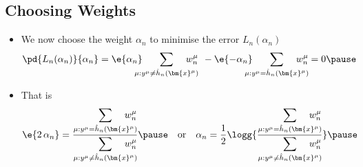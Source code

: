 \begin{slide}
\section{Choosing Weights}

\begin{PauseHighLight}
  \begin{itemize}
  \item We now choose the weight $\alpha_n$ to minimise the error $L_n(\alpha_n)$
    \begin{align*}
      \pd{L_n(\alpha_n)}{\alpha_n} = 
       \e{\alpha_n} \hspace{-1em} \sum_{\mu:y^\mu\neq
      \hat{h}_n(\bm{x}^\mu)} \hspace{-1.5em}  w_n^\mu\, \;- 
      \e{-\alpha_n} \hspace{-1em} \sum_{\mu:y^\mu= \hat{h}_n(\bm{x}^\mu)}
      \hspace{-1.5em} w_n^\mu =0\pause
    \end{align*}
  \item That is
    \begin{align*}
      \e{2\,\alpha_n} &= \frac{\displaystyle \sum_{\mu:y^\mu=
      \hat{h}_n(\bm{x}^\mu)} \hspace{-1.5em} w_n^\mu}{\displaystyle
                        \sum_{\mu:y^\mu\neq \hat{h}_n(\bm{x}^\mu)} \hspace{-1.5em} w_n^\mu}\pause
                        & \text{or}& &
     \alpha_n &= \frac{1}{2} \logg{\frac{\displaystyle \sum_{\mu:y^\mu=
      \hat{h}_n(\bm{x}^\mu)} \hspace{-1.5em} w_n^\mu}{\displaystyle
                \sum_{\mu:y^\mu\neq \hat{h}_n(\bm{x}^\mu)}\hspace{-1.5em} w_n^\mu}}\pause
    \end{align*}
  \end{itemize}
\end{PauseHighLight}

\end{slide}



